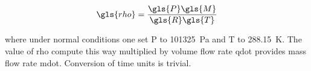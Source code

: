 \documentclass[12pt]{article}%
\begin{document}
\begin{equation}
\gls{rho} = \dfrac{\gls{P}\gls{M}}{\gls{R}\gls{T}}
\end{equation}

\noindent{}where under normal conditions one set \gls{P} to \SI{101325}{\pascal} and \gls{T} to \SI{288.15}{\kelvin}. The value of \gls{rho} compute this way multiplied by volume flow rate \gls{qdot} provides mass flow rate \gls{mdot}. Conversion of time units is trivial.

\printunsrtglossary[type=symbols,style=long]%

\printbibliography%
\end{document}
